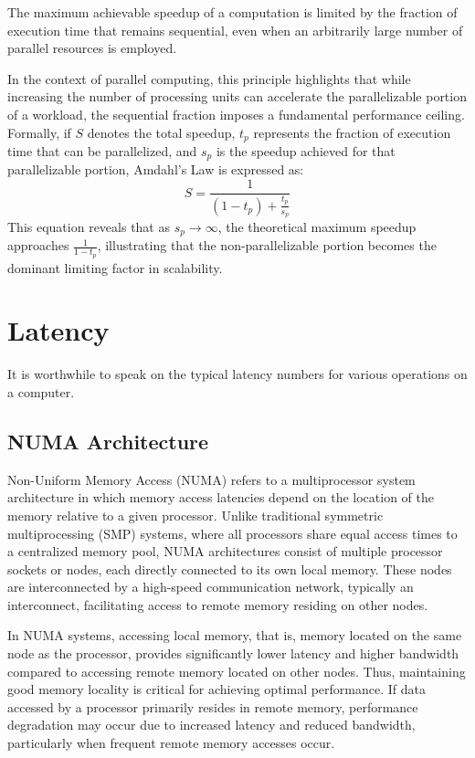 \begin{definition} The maximum achievable speedup of a computation is limited by the fraction of execution time that remains sequential, even when an arbitrarily large number of parallel resources is employed. \end{definition}

In the context of parallel computing, this principle highlights that while increasing the number of processing units can accelerate the parallelizable portion of a workload, the sequential fraction imposes a fundamental performance ceiling. Formally, if \(S\)  denotes the total speedup, \(t_{p}\) represents the fraction of execution time that can be parallelized, and \(s_{p}\) is the speedup achieved for that parallelizable portion, Amdahl’s Law is expressed as:
\begin{equation} S = \frac{1}{(1 - t_p) + \frac{t_p}{s_p}} \end{equation}
This equation reveals that as \(s_{p} \rightarrow \infty\), the theoretical maximum speedup approaches \(\frac{1}{1-t_{p}}\), illustrating that the non-parallelizable portion becomes the dominant limiting factor in scalability.


\section{Latency}

It is worthwhile to speak on the typical latency numbers for various operations on a computer. 



\subsection{NUMA Architecture}

Non-Uniform Memory Access (NUMA) refers to a multiprocessor system architecture in which memory access latencies depend on the location of the memory relative to a given processor. Unlike traditional symmetric multiprocessing (SMP) systems, where all processors share equal access times to a centralized memory pool, NUMA architectures consist of multiple processor sockets or nodes, each directly connected to its own local memory. These nodes are interconnected by a high-speed communication network, typically an interconnect, facilitating access to remote memory residing on other nodes.

In NUMA systems, accessing local memory, that is, memory located on the same node as the processor, provides significantly lower latency and higher bandwidth compared to accessing remote memory located on other nodes. Thus, maintaining good memory locality is critical for achieving optimal performance. If data accessed by a processor primarily resides in remote memory, performance degradation may occur due to increased latency and reduced bandwidth, particularly when frequent remote memory accesses occur.

